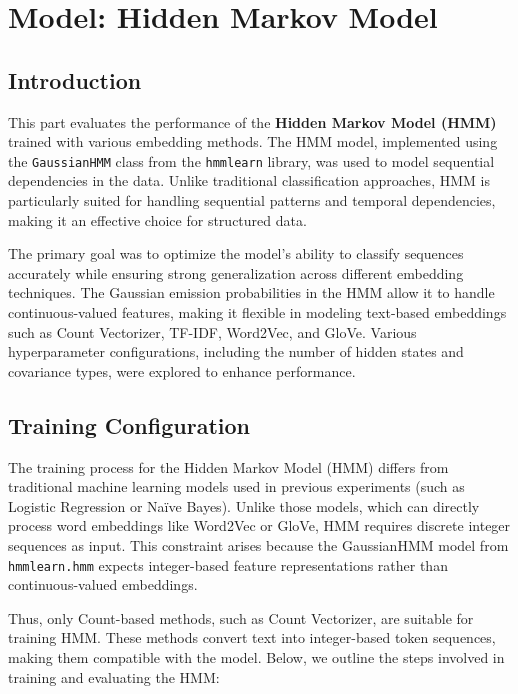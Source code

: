\section{Model: Hidden Markov Model}

\subsection{Introduction}

This part evaluates the performance of the \textbf{Hidden Markov Model (HMM)} trained with various embedding methods. The HMM model, implemented using the \texttt{GaussianHMM} class from the \texttt{hmmlearn} library, was used to model sequential dependencies in the data. Unlike traditional classification approaches, HMM is particularly suited for handling sequential patterns and temporal dependencies, making it an effective choice for structured data. 

The primary goal was to optimize the model's ability to classify sequences accurately while ensuring strong generalization across different embedding techniques. The Gaussian emission probabilities in the HMM allow it to handle continuous-valued features, making it flexible in modeling text-based embeddings such as Count Vectorizer, TF-IDF, Word2Vec, and GloVe. Various hyperparameter configurations, including the number of hidden states and covariance types, were explored to enhance performance.


\subsection{Training Configuration}

The training process for the Hidden Markov Model (HMM) differs from traditional machine learning models used in previous experiments (such as Logistic Regression or Naïve Bayes). Unlike those models, which can directly process word embeddings like Word2Vec or GloVe, HMM requires discrete integer sequences as input. This constraint arises because the GaussianHMM model from \texttt{hmmlearn.hmm} expects integer-based feature representations rather than continuous-valued embeddings. 

Thus, only Count-based methods, such as Count Vectorizer, are suitable for training HMM. These methods convert text into integer-based token sequences, making them compatible with the model. Below, we outline the steps involved in training and evaluating the HMM:


